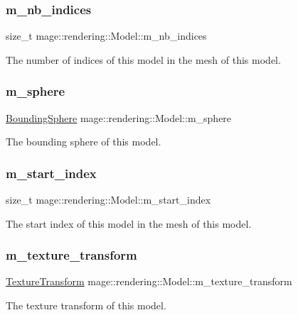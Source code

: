\subsubsection{\texorpdfstring{m\+\_\+nb\+\_\+indices}{m\_nb\_indices}}
{\footnotesize\ttfamily size\+\_\+t mage\+::rendering\+::\+Model\+::m\+\_\+nb\+\_\+indices\hspace{0.3cm}{\ttfamily [private]}}

The number of indices of this model in the mesh of this model. \hypertarget{classmage_1_1rendering_1_1_model_a88220cb828f0df79489c512245560616}{}\label{classmage_1_1rendering_1_1_model_a88220cb828f0df79489c512245560616} 
\subsubsection{\texorpdfstring{m\+\_\+sphere}{m\_sphere}}
{\footnotesize\ttfamily \hyperlink{classmage_1_1_bounding_sphere}{Bounding\+Sphere} mage\+::rendering\+::\+Model\+::m\+\_\+sphere\hspace{0.3cm}{\ttfamily [private]}}

The bounding sphere of this model. \hypertarget{classmage_1_1rendering_1_1_model_a6144f71f0f1d539f5664b07088859751}{}\label{classmage_1_1rendering_1_1_model_a6144f71f0f1d539f5664b07088859751} 
\subsubsection{\texorpdfstring{m\+\_\+start\+\_\+index}{m\_start\_index}}
{\footnotesize\ttfamily size\+\_\+t mage\+::rendering\+::\+Model\+::m\+\_\+start\+\_\+index\hspace{0.3cm}{\ttfamily [private]}}

The start index of this model in the mesh of this model. \hypertarget{classmage_1_1rendering_1_1_model_a00ad04fc770af700b97f69c83dc01d70}{}\label{classmage_1_1rendering_1_1_model_a00ad04fc770af700b97f69c83dc01d70} 
\subsubsection{\texorpdfstring{m\+\_\+texture\+\_\+transform}{m\_texture\_transform}}
{\footnotesize\ttfamily \hyperlink{classmage_1_1_texture_transform}{Texture\+Transform} mage\+::rendering\+::\+Model\+::m\+\_\+texture\+\_\+transform\hspace{0.3cm}{\ttfamily [private]}}

The texture transform of this model. 